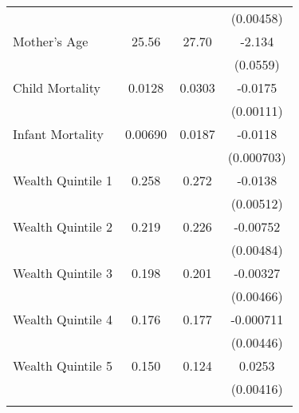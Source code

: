 \begin{table}[htbp]
{\begin{tabular}{l*{1}{ccc}}
                    &            &            &   (0.00458)         \\
Mother's Age        &       25.56&       27.70&      -2.134\sym{***}\\
                    &            &            &    (0.0559)         \\
Child Mortality     &      0.0128&      0.0303&     -0.0175\sym{***}\\
                    &            &            &   (0.00111)         \\
Infant Mortality    &     0.00690&      0.0187&     -0.0118\sym{***}\\
                    &            &            &  (0.000703)         \\
Wealth Quintile 1   &       0.258&       0.272&     -0.0138\sym{**} \\
                    &            &            &   (0.00512)         \\
Wealth Quintile 2   &       0.219&       0.226&    -0.00752         \\
                    &            &            &   (0.00484)         \\
Wealth Quintile 3   &       0.198&       0.201&    -0.00327         \\
                    &            &            &   (0.00466)         \\
Wealth Quintile 4   &       0.176&       0.177&   -0.000711         \\
                    &            &            &   (0.00446)         \\
Wealth Quintile 5   &       0.150&       0.124&      0.0253\sym{***}\\
                    &            &            &   (0.00416)         \\
\bottomrule\normalsize\end{tabular}}\end{table} 
